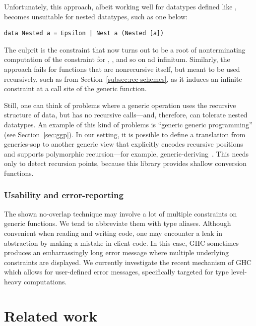 \documentclass[sigplan,screen,review,anonymous]{acmart}
\begin{document}
Unfortunately, this approach, albeit working well for datatypes defined like , becomes unsuitable for nested datatypes, such as one below:
\begin{lstlisting}[style=fancy]
data Nested a = Epsilon | Nest a (Nested [a])
\end{lstlisting}
The culprit is the constraint  that now turns out to be a root of nonterminating computation of the  constraint for \K{[.a]}, \K{[..[.a],]}, and so on ad infinitum. Similarly, the approach fails for functions that are nonrecursive itself, but meant to be used recursively, such as  from Section~\ref{subsec:rec-schemes}, as it induces an infinite constraint at a call site of the generic function.

Still, one can think of problems where a generic operation uses the recursive structure of data, but has no recursive calls---and, therefore, can tolerate nested datatypes. An example of this kind of problems is ``generic generic programming'' (see Section~\ref{sec:ggp}). In our setting, it is possible to define a translation from \textsf{generics-sop} to another generic view that explicitly encodes recursive positions and supports polymorphic recursion---for example, \textsf{generic-deriving}~\cite{Magalhaes2010}. This needs only to detect recursion points, because this library provides shallow conversion functions.

\subsubsection{Usability and error-reporting}

The shown no-overlap technique may involve a lot of multiple constraints on generic functions. We tend to abbreviate them with type aliases. Although convenient when reading and writing code, one may encounter a leak in abstraction by making a mistake in client code. In this case, GHC sometimes produces an embarrassingly long error message where multiple underlying constraints are displayed. We currently investigate the  recent mechanism of GHC which allows for user-defined error messages, specifically targeted for type level-heavy computations.

\section{Related work}
\label{sec:related-work}
\end{document}
